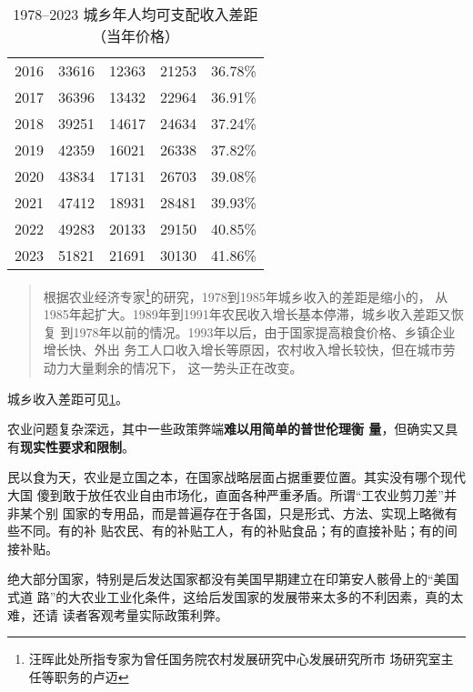 \begin{table}[htbp]
\begin{minipage}{0.47\textwidth}
{\begin{tabular}{ccccc}
        2016       & 33616       & 12363       & 21253         & 36.78\%        \\
        2017       & 36396       & 13432       & 22964         & 36.91\%        \\
        2018       & 39251       & 14617       & 24634         & 37.24\%        \\
        2019       & 42359       & 16021       & 26338         & 37.82\%        \\
        2020       & 43834       & 17131       & 26703         & 39.08\%        \\
        2021       & 47412       & 18931       & 28481         & 39.93\%        \\
        2022       & 49283       & 20133       & 29150         & 40.85\%        \\
        2023       & 51821       & 21691       & 30130         & 41.86\%        \\ \bottomrule
      \end{tabular}%
    }
  \end{minipage}

  \caption{1978--2023 城乡年人均可支配收入差距（当年价格）}
  \label{tab:chengxiangcha}

  \StopDefiningTabulars
\end{table}


\begin{quotation}
  根据农业经济专家\footnote{汪晖此处所指专家为曾任国务院农村发展研究中心发展研究所市
    场研究室主任等职务的卢迈}的研究，1978到1985年城乡收入的差距是缩小的，
  从1985年起扩大。1989年到1991年农民收入增长基本停滞，城乡收入差距又恢复
  到1978年以前的情况。1993年以后，由于国家提高粮食价格、乡镇企业增长快、外出
  务工人口收入增长等原因，农村收入增长较快，但在城市劳动力大量剩余的情况下，
  这一势头正在改变。\cite{wangxiandai}
\end{quotation}
城乡收入差距可见\cref{tab:chengxiangcha}。


农业问题复杂深远，其中一些政策弊端\textbf{难以用简单的普世伦理衡
  量}，但确实又具有\textbf{现实性要求和限制}。

民以食为天，农业是立国之本，在国家战略层面占据重要位置。其实没有哪个现代大国
傻到敢于放任农业自由市场化，直面各种严重矛盾。所谓“工农业剪刀差”并非某个别
国家的专用品，而是普遍存在于各国，只是形式、方法、实现上略微有些不同。有的补
贴农民、有的补贴工人，有的补贴食品；有的直接补贴；有的间接补贴。

绝大部分国家，特别是后发达国家都没有美国早期建立在印第安人骸骨上的“美国式道
路”的大农业工业化条件，这给后发国家的发展带来太多的不利因素，真的太难，还请
读者客观考量实际政策利弊。

